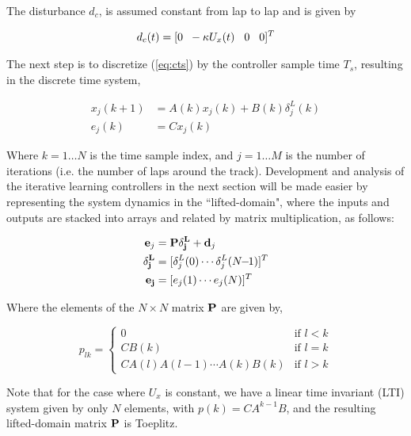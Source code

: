 \documentclass[letterpaper, 10 pt, conference]{ieeeconf}  %
\begin{document}
The disturbance $d_c$, is assumed constant from lap to lap and is given by

\begin{align}
d_c(t) = [0 \hspace{2 mm} -\kappa U_x(t) \hspace{3 mm} 0 \hspace{3 mm}  0]^T
\end{align}

The next step is to discretize (\ref{eq:cts}) by the controller sample
time $T_s$, resulting in the discrete time system,

\begin{align}
x_j(k\!\!+\!\!1) &= A(k)x_j(k) + B(k)\delta^L_j(k)\\
e_j(k) &= Cx_j(k)
\label{eq:discreteEOM}
\end{align}

Where $k = 1\ldots N$ is the time sample index, and $j = 1\ldots M$ is the number of iterations (i.e. the number of laps around the track). 
Development and analysis of the iterative learning controllers in the next section will be made easier by representing the system dynamics in the ``lifted-domain",
where the inputs  and outputs  are stacked into arrays and related by matrix multiplication, as follows:

\begin{subequations}
\label{eq:liftedDomain}
\begin{align}
\mathbf{e}_j        &= \mathbf{P}\mathbf{\delta^L_j} + \mathbf{d}_j\\
\bf{\delta}_j^L  &=[\delta^L_j(0) \cdots \delta^L_j(N\!\!-\!\!1)]^T\\
\bf{e}_j        &= [e_j(1) \cdots e_j(N)]^T
\end{align}
\end{subequations}


Where the elements of the $N \times  N$ matrix $\bf{P}$ are given by,

\begin{equation}
p_{lk} = \begin{cases} 0 &\mbox{if } l < k \\ 
CB(k) & \mbox{if } l = k \\
CA(l)A(l-1)\cdots A(k)B(k) &\mbox{if } l > k \end{cases}
\end{equation} 

Note that for the case where $U_x$ is constant, we have a linear time invariant (LTI) system given by only
$N$ elements, with $p(k) = CA^{k-1}B$, and the resulting lifted-domain matrix $\bf{P}$ is Toeplitz. 
\end{document}
